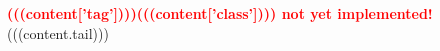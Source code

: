 \textcolor{red}{\Large \textbf{(((content['tag'])))(((content['class']))) not yet implemented!}}
(((content.tail)))
